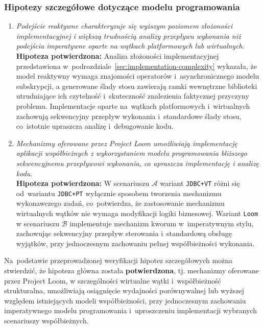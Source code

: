 \subsubsection{Hipotezy szczegółowe dotyczące modelu programowania}
\begin{enumerate}[label=\textbf{H\arabic*.}, start=8]
    \itemsep0em

    \item \textit{Podejście reaktywne charakteryzuje się wyższym poziomem złożoności implementacyjnej i większą trudnością analizy przepływu wykonania niż podejścia imperatywne oparte na wątkach platformowych lub wirtualnych.} \\[0.5em] \textbf{Hipoteza potwierdzona:} Analiza złożoności implementacyjnej przedstawiona w~podrozdziale~\ref{sec:implementation-complexity} wykazała, że model reaktywny wymaga znajomości operatorów i~asynchronicznego modelu subskrypcji, a generowane ślady stosu zawierają ramki wewnętrzne biblioteki utrudniające ich czytelność i~skuteczność znalezienia faktycznej przyczyny problemu. Implementacje oparte na~wątkach platformowych i~wirtualnych zachowują sekwencyjny przepływ wykonania i~standardowe ślady stosu, co~istotnie upraszcza analizę i~debugowanie kodu.
    
    \item \textit{Mechanizmy oferowane przez Project Loom umożliwiają implementację aplikacji współbieżnych z wykorzystaniem modelu programowania bliższego sekwencyjnemu przepływowi wykonania, co upraszcza implementację i analizę kodu.} \\[0.5em] \textbf{Hipoteza potwierdzona:} W scenariuszu $\mathcal{A}$ wariant \texttt{JDBC+VT} różni się od~wariantu \texttt{JDBC+PT} wyłącznie sposobem tworzenia mechanizmu wykonawczego zadań, co~potwierdza, że zastosowanie mechanizmu wirtualnych wątków nie wymaga modyfikacji logiki biznesowej. Wariant \texttt{Loom} w scenariuszu $\mathcal{B}$ implementuje mechanizm kworum w~imperatywnym stylu, zachowując sekwencyjny przepływ sterowania i~standardową obsługę wyjątków, przy jednoczesnym zachowaniu pełnej współbieżności wykonania.

\end{enumerate}

Na~podstawie przeprowadzonej weryfikacji hipotez szczegółowych można stwierdzić, że hipoteza główna została \textbf{potwierdzona}, tj. mechanizmy oferowane przez Project Loom, w szczególności wirtualne wątki i~współbieżność strukturalna, umożliwiają osiągnięcie wydajności porównywalnej lub wyższej względem istniejących modeli współbieżności, przy jednoczesnym zachowaniu imperatywnego modelu programowania i~uproszczeniu implementacji wybranych scenariuszy współbieżnych.

